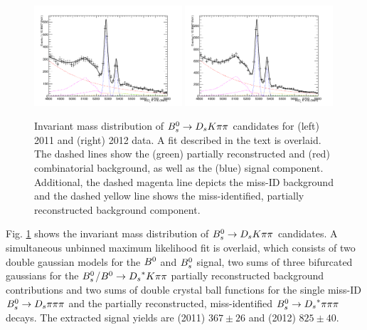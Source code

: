 \begin{figure}[h]
\includegraphics[height=7.cm,width=0.49\textwidth]{figs/BmassFit_sim11.pdf}
\includegraphics[height=7.cm,width=0.49\textwidth]{figs/BmassFit_sim12.pdf}
\caption{Invariant mass distribution of ${{B}^0_{s}}\rightarrow{\ensuremath{{D}_{s}}}{\ensuremath{K}}{\ensuremath{\pi}}{\ensuremath{\pi}}$ candidates for (left) 2011 and (right) 2012 data.
A fit described in the text is overlaid. The dashed lines show the (green) partially reconstructed and (red) combinatorial background, as well as the (blue) signal component. 
Additional, the dashed magenta line depicts the miss-ID background and the dashed yellow line shows the miss-identified, partially reconstructed background component.}
\label{fig: BsDsKpipiFit}
\end{figure}


Fig. \ref{fig: BsDsKpipiFit} shows the invariant mass distribution of ${{B}^0_{s}}\rightarrow{\ensuremath{{D}_{s}}}{\ensuremath{K}}{\ensuremath{\pi}}{\ensuremath{\pi}}$ candidates. 
A simultaneous unbinned maximum likelihood fit is overlaid, which consists of two double gaussian models for the ${{B}^0}$ and ${{B}^0_{s}}$ signal, two sums of three bifurcated gaussians for the ${{B}^0_{s}}$/${{B}^0}\rightarrow{\ensuremath{{D}_{s}}}^{*}{K}{\pi}{\pi}$ partially reconstructed background contributions and two sums of double crystal ball functions for the single miss-ID ${{B}^0_{s}}\rightarrow{\ensuremath{{D}_{s}}}{\ensuremath{\pi}}{\ensuremath{\pi}}{\ensuremath{\pi}}$ and the partially reconstructed, miss-identified ${{B}^0_{s}}\rightarrow{\ensuremath{{D}_{s}}}^{*}{\pi}{\pi}{\pi}$ decays. \newline
The extracted signal yields are (2011) $367 \pm  26$ and (2012) $825 \pm 40$.  


